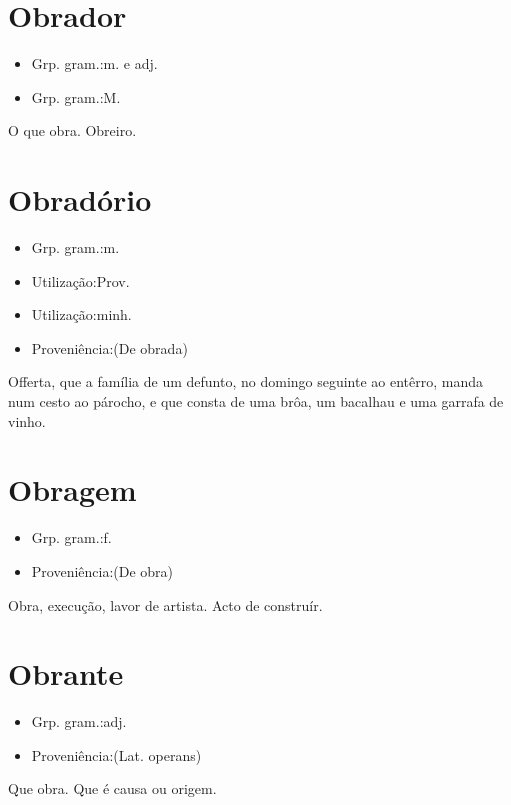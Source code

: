 \section{Obrador}
\begin{itemize}
\item {Grp. gram.:m.  e  adj.}
\end{itemize}
\begin{itemize}
\item {Grp. gram.:M.}
\end{itemize}
O que obra.
Obreiro.
\section{Obradório}
\begin{itemize}
\item {Grp. gram.:m.}
\end{itemize}
\begin{itemize}
\item {Utilização:Prov.}
\end{itemize}
\begin{itemize}
\item {Utilização:minh.}
\end{itemize}
\begin{itemize}
\item {Proveniência:(De \textunderscore obrada\textunderscore )}
\end{itemize}
Offerta, que a família de um defunto, no domingo seguinte ao entêrro, manda num cesto ao párocho, e que consta de uma brôa, um bacalhau e uma garrafa de vinho.
\section{Obragem}
\begin{itemize}
\item {Grp. gram.:f.}
\end{itemize}
\begin{itemize}
\item {Proveniência:(De \textunderscore obra\textunderscore )}
\end{itemize}
Obra, execução, lavor de artista.
Acto de construír.
\section{Obrante}
\begin{itemize}
\item {Grp. gram.:adj.}
\end{itemize}
\begin{itemize}
\item {Proveniência:(Lat. \textunderscore operans\textunderscore )}
\end{itemize}
Que obra.
Que é causa ou origem.
